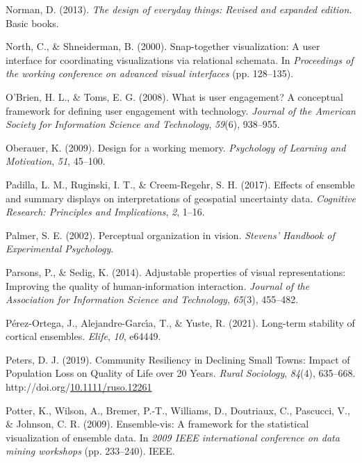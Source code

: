 \documentclass[print]{nuthesis}
\newlength{\cslhangindent}
\newenvironment{CSLReferences}[2]%
{\setlength{\parindent}{0pt}%
\everypar{\setlength{\hangindent}{\cslhangindent}}\ignorespaces}%
{\par}
\begin{document}
\begin{CSLReferences}{1}{0}
\leavevmode{}%
Norman, D. (2013). \emph{The design of everyday things: Revised and expanded edition}. Basic books.

\leavevmode{}%
North, C., \& Shneiderman, B. (2000). Snap-together visualization: A user interface for coordinating visualizations via relational schemata. In \emph{Proceedings of the working conference on advanced visual interfaces} (pp. 128--135).

\leavevmode{}%
O'Brien, H. L., \& Toms, E. G. (2008). What is user engagement? A conceptual framework for defining user engagement with technology. \emph{Journal of the American Society for Information Science and Technology}, \emph{59}(6), 938--955.

\leavevmode{}%
Oberauer, K. (2009). Design for a working memory. \emph{Psychology of Learning and Motivation}, \emph{51}, 45--100.

\leavevmode{}%
Padilla, L. M., Ruginski, I. T., \& Creem-Regehr, S. H. (2017). Effects of ensemble and summary displays on interpretations of geospatial uncertainty data. \emph{Cognitive Research: Principles and Implications}, \emph{2}, 1--16.

\leavevmode{}%
Palmer, S. E. (2002). Perceptual organization in vision. \emph{Stevens' Handbook of Experimental Psychology}.

\leavevmode{}%
Parsons, P., \& Sedig, K. (2014). Adjustable properties of visual representations: Improving the quality of human-information interaction. \emph{Journal of the Association for Information Science and Technology}, \emph{65}(3), 455--482.

\leavevmode{}%
Pérez-Ortega, J., Alejandre-Garcı́a, T., \& Yuste, R. (2021). Long-term stability of cortical ensembles. \emph{Elife}, \emph{10}, e64449.

\leavevmode{}%
Peters, D. J. (2019). Community {Resiliency} in {Declining} {Small} {Towns}: {Impact} of {Population} {Loss} on {Quality} of {Life} over 20 {Years}. \emph{Rural Sociology}, \emph{84}(4), 635--668. http://doi.org/\href{https://doi.org/10.1111/ruso.12261}{10.1111/ruso.12261}

\leavevmode{}%
Potter, K., Wilson, A., Bremer, P.-T., Williams, D., Doutriaux, C., Pascucci, V., \& Johnson, C. R. (2009). Ensemble-vis: A framework for the statistical visualization of ensemble data. In \emph{2009 IEEE international conference on data mining workshops} (pp. 233--240). IEEE.


\end{CSLReferences}
\end{document}
